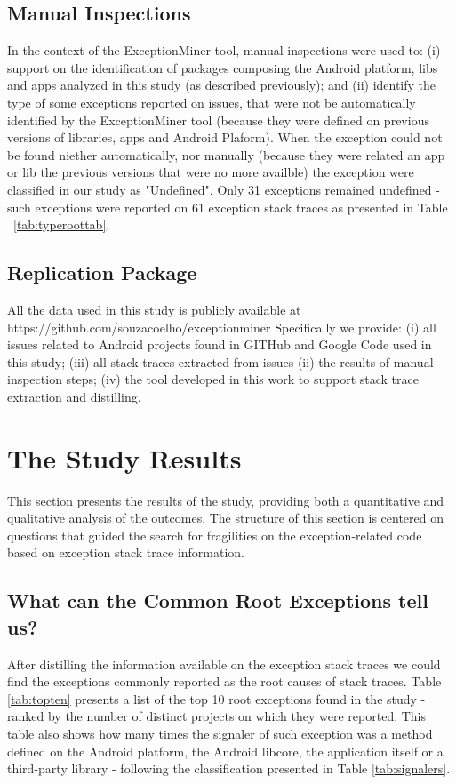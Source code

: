 \documentclass[conference]{IEEEtran}
\begin{document}
\subsection{Manual Inspections}
In the context of the ExceptionMiner tool, manual inspections were used to:
(i) support on the identification of packages composing the Android platform, 
libs and apps analyzed in this study (as described previously); and (ii)  
identify the type of some exceptions reported on issues, 
that were not be automatically identified by the ExceptionMiner tool
(because they were defined on previous versions of libraries,
apps and Android Plaform). When the exception could not be  
found niether automatically, nor manually (because they were related an app or lib the previous versions
that were no more availble) the exception were classified 
in our study as "Undefined".  Only 31 exceptions 
remained undefined - such exceptions were reported on 61 exception stack traces as 
presented in Table ~\ref{tab:typeroottab}.

\subsection{Replication Package}
All the data used in this study is publicly available at https://github.com/souzacoelho/exceptionminer
Specifically we provide: (i) all issues related to Android projects found
in GITHub and Google Code used in this study; (iii) all stack traces extracted
from issues (ii) the results of manual inspection steps; (iv) the tool developed 
in this work to support stack trace extraction and distilling.

\section{The Study Results}
\label{sec:result}

This section presents the results of the study, providing both a
quantitative and qualitative analysis of the outcomes. The structure of this section
 is centered on questions that guided the search for fragilities on the exception-related code
based on exception stack trace information.

\subsection{What can the Common Root Exceptions tell us? }

After distilling the information available on the exception stack traces we could find 
the exceptions commonly reported as the root causes of stack traces.
Table \ref{tab:topten} presents a list of the top 10 root exceptions found in the study - 
 ranked by the number of distinct projects on which they were reported. 
This table also shows how many times the signaler of such exception was a method defined on
the Android platform, the Android libcore, the application itself or a third-party library -
 following the classification presented in Table  \ref{tab:signalers}. 
\end{document}

